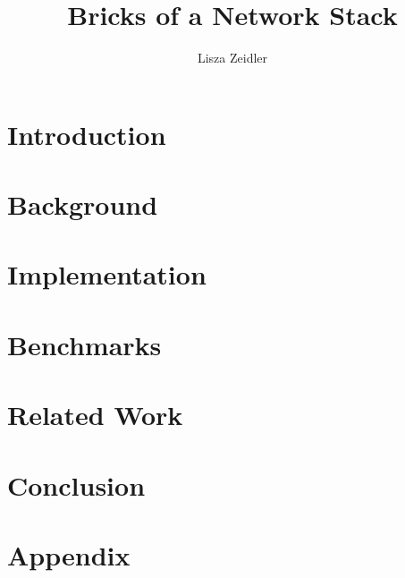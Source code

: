 \documentclass[diplominf, bibnum, lof, lot]{zihpub}
\author{Lisza Zeidler}
\title{Bricks of a Network Stack}
\begin{document}
\chapter{Introduction}
\label{Chapter:Intro}


\chapter{Background}
\label{Chapter:Background}


\chapter{Implementation}
\label{Chapter:Implementation}


\chapter{Benchmarks}
\label{Chapter:Benchmarks}


\chapter{Related Work}
\label{Chapter:Related}



\chapter{Conclusion}
\label{Chapter:Discussion}


\appendix
\chapter{Appendix}
\label{Appendix}

\end{document}
